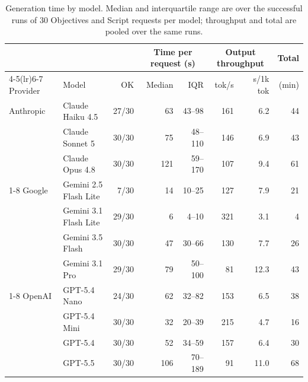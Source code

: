%
%
%
%

\begin{table}[htbp]
  \centering
  \caption{Generation time by model. Median and interquartile range are over the successful runs of 30 Objectives and Script requests per model; throughput and total are pooled over the same runs.}
  \label{tab:generation-time}
  \small
  \begin{tabular}{llrrrrrr}
    \toprule
    & & & \multicolumn{2}{c}{Time per request (s)} & \multicolumn{2}{c}{Output throughput} & Total \\
    \cmidrule(lr){4-5}\cmidrule(lr){6-7}
    Provider & Model & OK & Median & IQR & tok/s & s/1k tok & (min) \\
    \midrule
    Anthropic & Claude Haiku 4.5 & 27/30 & 63 & 43--98 & 161 & 6.2 & 44 \\
     & Claude Sonnet 5 & 30/30 & 75 & 48--110 & 146 & 6.9 & 43 \\
     & Claude Opus 4.8 & 30/30 & 121 & 59--170 & 107 & 9.4 & 61 \\
    \cmidrule(lr){1-8}
    Google & Gemini 2.5 Flash Lite & 7/30 & 14 & 10--25 & 127 & 7.9 & 21 \\
     & Gemini 3.1 Flash Lite & 29/30 & 6 & 4--10 & 321 & 3.1 & 4 \\
     & Gemini 3.5 Flash & 30/30 & 47 & 30--66 & 130 & 7.7 & 26 \\
     & Gemini 3.1 Pro & 29/30 & 79 & 50--100 & 81 & 12.3 & 43 \\
    \cmidrule(lr){1-8}
    OpenAI & GPT-5.4 Nano & 24/30 & 62 & 32--82 & 153 & 6.5 & 38 \\
     & GPT-5.4 Mini & 30/30 & 32 & 20--39 & 215 & 4.7 & 16 \\
     & GPT-5.4 & 30/30 & 52 & 34--59 & 157 & 6.4 & 30 \\
     & GPT-5.5 & 30/30 & 106 & 70--189 & 91 & 11.0 & 68 \\
    \bottomrule
  \end{tabular}
\end{table}

